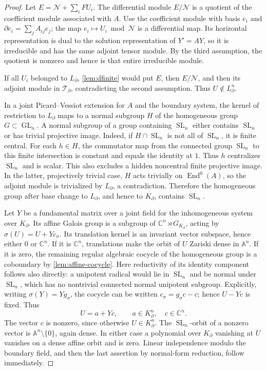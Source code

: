 \documentclass[11pt]{article}
\numberwithin{equation}{section}
\theoremstyle{definition}
\theoremstyle{remark}
\newcommand{\C}{\mathbb C}
\newcommand{\End}{\operatorname{End}}
\newcommand{\SL}{\operatorname{SL}}
\newcommand{\GL}{\operatorname{GL}}
\newcommand{\Ncal}{\mathcal N}
\newcommand{\Tcal}{\mathcal T}
\newcommand{\A}{\mathbb A}
\begin{document}
\begin{proof}
Let $E=\Ncal+\sum_i FU_i$. The differential module $E/\Ncal$ is a
quotient of the coefficient module associated with $A$. Use the coefficient module with basis $e_i$ and
$\partial e_i=\sum_j A_{ij}e_j$; the map $e_i\mapsto U_i\bmod\Ncal$
is a differential map. Its horizontal representation is dual to the
solution representation of $Y'=AY$, so it is irreducible and has the same
adjoint tensor module. By the third assumption, the quotient is nonzero and hence is
that entire irreducible module.

If all $U_i$ belonged to $L_\partial$, \cref{lem:dfinite} would put $E$,
then $E/\Ncal$, and then its adjoint module in $\Tcal_\partial$,
contradicting the second assumption. Thus $U\notin L_\partial^n$.

In a joint Picard--Vessiot extension for $A$ and the boundary system, the
kernel of restriction to $L_\partial$ maps to a normal subgroup $H$ of
the homogeneous group $G\subset\GL_n$. A normal subgroup of a group
containing $\SL_n$ either contains $\SL_n$ or has trivial projective
image. Indeed, if $H\cap\SL_n$ is not all of $\SL_n$, it is finite central.
For each $h\in H$, the commutator map from the connected group $\SL_n$
to this finite intersection is constant and equals the identity at $1$.
Thus $h$ centralizes $\SL_n$ and is scalar. This also excludes a hidden
noncentral finite projective image. In the latter, projectively trivial case, $H$ acts
trivially on $\End^0(A)$, so the adjoint module is trivialized by
$L_\partial$, a contradiction. Therefore the homogeneous group after
base change to $L_\partial$, and hence to $K_\partial$, contains $\SL_n$.

Let $Y$ be a fundamental matrix over a joint field for the inhomogeneous
system over $K_\partial$. Its affine Galois group is a subgroup of
$\C^n\rtimes G_{K_\partial}$, acting by
$\sigma(U)=U+Yc_\sigma$. Its translation kernel is an invariant vector
subspace, hence either $0$ or $\C^n$.
If it is $\C^n$, translations make the orbit of $U$ Zariski dense in
$\A^n$. If it is zero, the remaining regular algebraic cocycle of the
homogeneous group is a coboundary by \cref{lem:affine-cocycle}.
Here reductivity of its identity component follows
also directly: a unipotent radical would lie in $\SL_n$ and be normal
under $\SL_n$, which has no nontrivial connected normal unipotent
subgroup. Explicitly, writing $\sigma(Y)=Yg_\sigma$, the cocycle
can be written $c_\sigma=g_\sigma c-c$; hence $U-Yc$ is fixed. Thus
\[
 U=a+Yc,\qquad a\in K_\partial^n,\quad c\in\C^n.
\]
The vector $c$ is nonzero, since otherwise $U\in K_\partial^n$. The
$\SL_n$-orbit of a nonzero vector is $\A^n\setminus\{0\}$, again dense.
In either case a polynomial over $K_\partial$ vanishing at $U$ vanishes
on a dense affine orbit and is zero. Linear independence modulo the
boundary field, and then the last assertion by normal-form reduction,
follow immediately.
\end{proof}
\end{document}
